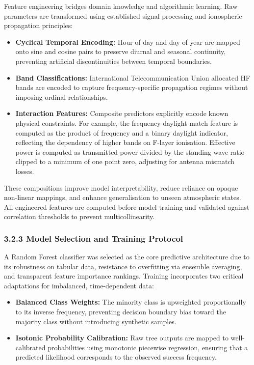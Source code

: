 Feature engineering bridges domain knowledge and algorithmic learning.
Raw parameters are transformed using established signal processing and
ionospheric propagation principles:

\begin{itemize}
\tightlist
\item
  \textbf{Cyclical Temporal Encoding:} Hour-of-day and day-of-year are
  mapped onto sine and cosine pairs to preserve diurnal and seasonal
  continuity, preventing artificial discontinuities between temporal
  boundaries.
\item
  \textbf{Band Classifications:} International Telecommunication Union
  allocated HF bands are encoded to capture frequency-specific
  propagation regimes without imposing ordinal relationships.
\item
  \textbf{Interaction Features:} Composite predictors explicitly encode
  known physical constraints. For example, the frequency-daylight match
  feature is computed as the product of frequency and a binary daylight
  indicator, reflecting the dependency of higher bands on F-layer
  ionisation. Effective power is computed as transmitted power divided
  by the standing wave ratio clipped to a minimum of one point zero,
  adjusting for antenna mismatch losses.
\end{itemize}

These compositions improve model interpretability, reduce reliance on
opaque non-linear mappings, and enhance generalisation to unseen
atmospheric states. All engineered features are computed before model
training and validated against correlation thresholds to prevent
multicollinearity.

\subsubsection{3.2.3 Model Selection and Training
Protocol}\label{model-selection-and-training-protocol}

A Random Forest classifier was selected as the core predictive
architecture due to its robustness on tabular data, resistance to
overfitting via ensemble averaging, and transparent feature importance
rankings. Training incorporates two critical adaptations for imbalanced,
time-dependent data:

\begin{itemize}
\tightlist
\item
  \textbf{Balanced Class Weights:} The minority class is upweighted
  proportionally to its inverse frequency, preventing decision boundary
  bias toward the majority class without introducing synthetic samples.
\item
  \textbf{Isotonic Probability Calibration:} Raw tree outputs are mapped
  to well-calibrated probabilities using monotonic piecewise regression,
  ensuring that a predicted likelihood corresponds to the observed
  success frequency.
\end{itemize}

